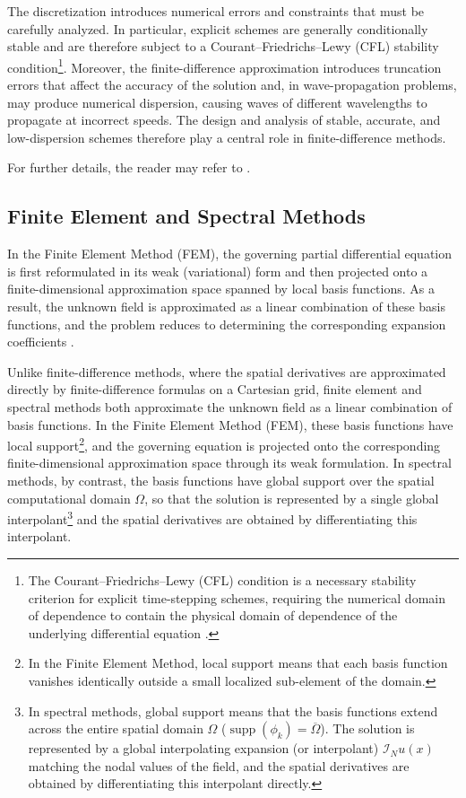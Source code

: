 \documentclass{Configuration_Files/PoliMi3i_thesis}
\newif\ifshowthesischanges
\DeclareRobustCommand{\thesischange}[2]{%
    \ifshowthesischanges
        \textcolor{#1}{#2}%
    \else
        #2%
    \fi
}
\def\thesischange#1#2{#2}%
\begin{document}
The discretization introduces numerical errors and constraints that must be carefully analyzed. In particular, explicit schemes are generally conditionally stable and are therefore subject to a Courant--Friedrichs--Lewy (CFL) stability condition\footnote{\thesischange{red}{The Courant--Friedrichs--Lewy (CFL) condition is a necessary stability criterion for explicit time-stepping schemes, requiring the numerical domain of dependence to contain the physical domain of dependence of the underlying differential equation \citep{courant1928partiellen}.}}. Moreover, the finite-difference approximation introduces truncation errors that affect the accuracy of the solution and, in wave-propagation problems, may produce numerical dispersion, causing waves of different wavelengths to propagate at incorrect speeds. The design and analysis of stable, accurate, and low-dispersion schemes therefore play a central role in finite-difference methods.

For further details, the reader may refer to \cite{bilbao_numerical_2009,bergman_computational_2018}.
%
\subsection{Finite Element and Spectral Methods}
In the Finite Element Method (FEM), the governing partial differential equation is first reformulated in its weak (variational) form and then projected onto a finite-dimensional approximation space spanned by local basis functions. As a result, the unknown field is approximated as a linear combination of these basis functions, and the problem reduces to determining the corresponding expansion coefficients \citep{bergman_computational_2018}.

 Unlike finite-difference methods, where the spatial derivatives are approximated directly by finite-difference formulas on a Cartesian grid, finite element and spectral methods both approximate the unknown field as a linear combination of basis functions. In the Finite Element Method (FEM), these basis functions have local support\footnote{\thesischange{red}{In the Finite Element Method, local support means that each basis function vanishes identically outside a small localized sub-element of the domain.}}, and the governing equation is projected onto the corresponding finite-dimensional approximation space through its weak formulation. In spectral methods, by contrast, the basis functions have global support over the spatial computational domain $\Omega$, so that the solution is represented by a single global interpolant\footnote{\thesischange{red}{In spectral methods, global support means that the basis functions extend across the entire spatial domain $\Omega$ ($\operatorname{supp}(\phi_k) = \overline{\Omega}$). The solution is represented by a global interpolating expansion (or interpolant) $\mathcal{I}_N u(x)$ matching the nodal values of the field, and the spatial derivatives are obtained by differentiating this interpolant directly.}} and the spatial derivatives are obtained by differentiating this interpolant.
\end{document}
